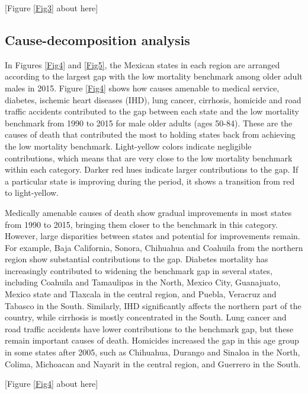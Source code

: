 \documentclass{bmcart}
\begin{document}
\begin{center}
[Figure \ref{Fig3} about here]
\end{center}


\subsection*{Cause-decomposition analysis}


In Figures \ref{Fig4} and \ref{Fig5}, the Mexican states in each region are arranged according to the largest gap with the low mortality benchmark among older adult males in 2015. Figure \ref{Fig4} shows how causes amenable to medical service, diabetes, ischemic heart diseases (IHD), lung cancer, cirrhosis, homicide and road traffic accidents contributed to the gap between each state and the low mortality benchmark from 1990 to 2015 for male older adults (ages 50-84). These are the causes of death that contributed the most to holding states back from achieving the low mortality benchmark. Light-yellow colors indicate negligible contributions, which means that are very close to the low mortality benchmark within each category. Darker red hues indicate larger contributions to the gap. If a particular state is improving during the period, it shows a transition from red to light-yellow. 

Medically amenable causes of death show gradual improvements in most states from 1990 to 2015, bringing them closer to the benchmark in this category. However, large disparities between states and potential for improvements remain. For example, Baja California, Sonora, Chihuahua and Coahuila from the northern region show substantial contributions to the gap. Diabetes mortality has increasingly contributed to widening the benchmark gap in several states, including Coahuila and Tamaulipas in the North, Mexico City, Guanajuato, Mexico state and Tlaxcala in the central region, and Puebla, Veracruz and Tabasco in the South. Similarly, IHD significantly affects the northern part of the country, while cirrhosis is mostly concentrated in the South. Lung cancer and road traffic accidents have lower contributions to the benchmark gap, but these remain important causes of death. Homicides increased the gap in this age group in some states after 2005, such as Chihuahua, Durango and Sinaloa in the North, Colima, Michoacan and Nayarit in the central region, and Guerrero in the South.\\

\begin{center}
[Figure \ref{Fig4} about here] \linebreak
\end{center}
\end{document}
